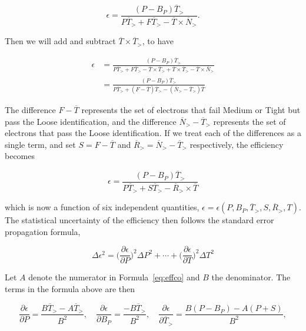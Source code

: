 $$
	\epsilon = \frac{(P-B_P)\overline{T}_>}{P\overline{T}_> + F\overline{T}_> - \overline{T}\times \overline{N}_>}.
$$

Then we will add and subtract $\overline{T} \times \overline{T}_>$, to have


\begin{equation*}
	\begin{split}
		\epsilon & = \frac{(P-B_P)\overline{T}_>}{P\overline{T}_> + F\overline{T}_> - \overline{T}\times \overline{T}_>
			+ \overline{T}\times \overline{T}_> - \overline{T}\times \overline{N}_>}  \\
		&  =  \frac{(P-B_P)\overline{T}_>}{P\overline{T}_> + (F - \overline{T})\overline{T}_>
			- (\overline{N}_> - \overline{T}_>)\overline{T}}
	\end{split}
\end{equation*}

The difference $F - \overline{T}$ represents the set of electrons that fail
Medium or Tight but pass the Loose identification, and the difference
$\overline{N}_> - \overline{T}_>$ represents the set of electrons that pass the
Loose identification. If we treat each of the differences as a single term, and
set $S = F - \overline{T}$ and $\overline{R}_> = \overline{N}_> -
	\overline{T}_>$ respectively, the efficiency becomes

\begin{equation}\label{eq:effco}
	\epsilon = \frac{(P-B_P)\overline{T}_>}{P\overline{T}_> + S\overline{T}_>
		- \overline{R}_>\times \overline{T}}
\end{equation}

which is now a function of six independent quantities, $\epsilon=\epsilon(P,
	B_P, \overline{T}_>, S, \overline{R}_>, T)$. The statistical uncertainty of the
efficiency then follows the standard error propagation formula,

\begin{equation}\label{eq:statprop}
	\Delta \epsilon^2 = \bigg(\frac{\partial \epsilon}{\partial P}\bigg)^2\Delta P^2 + \cdots +
	\bigg(\frac{\partial \epsilon}{\partial T}\bigg)^2\Delta T^2
\end{equation}


Let $A$ denote the numerator in Formula~\ref{eq:effco} and $B$ the denominator.
The terms in the formula above are then

$$\frac{\partial \epsilon}{\partial P} = \frac{B \overline{T}_> - A \overline{T}_> }{B^2},
	\quad
	\frac{\partial \epsilon}{\partial B_P} = \frac{- B \overline{T}_> }{B^2},
	\quad
	\frac{\partial \epsilon}{\partial \overline{T}_>} = \frac{B (P - B_P) - A(P + S) }{B^2},
$$

